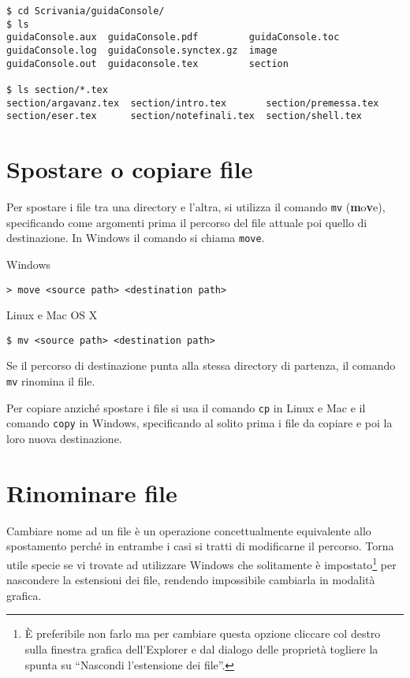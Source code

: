 \begin{Verbatim}[fontsize=\small]
$ cd Scrivania/guidaConsole/
$ ls
guidaConsole.aux  guidaConsole.pdf         guidaConsole.toc
guidaConsole.log  guidaConsole.synctex.gz  image
guidaConsole.out  guidaconsole.tex         section

$ ls section/*.tex
section/argavanz.tex  section/intro.tex       section/premessa.tex
section/eser.tex      section/notefinali.tex  section/shell.tex
\end{Verbatim}

\section{Spostare o copiare file}

Per spostare i file tra una directory e l'altra, si utilizza il comando
\texttt{mv} (\textbf{m}o\textbf{v}e), specificando come argomenti prima il
percorso del file attuale poi quello di destinazione. In Windows il comando si
chiama \texttt{move}.
\smallskip
\begin{tcolorbox}
Windows
\tcblower
\begin{verbatim}
> move <source path> <destination path>
\end{verbatim}
\end{tcolorbox}

\begin{tcolorbox}
Linux e Mac OS X
\tcblower
\begin{verbatim}
$ mv <source path> <destination path>
\end{verbatim}
\end{tcolorbox}

Se il percorso di destinazione punta alla stessa directory di partenza, il
comando \texttt{mv} rinomina il file.

Per copiare anziché spostare i file si usa il comando \texttt{cp} in Linux e
Mac e il comando \texttt{copy} in Windows, specificando al solito prima i file
da copiare e poi la loro nuova destinazione.

\section{Rinominare file}

Cambiare nome ad un file è un operazione concettualmente equivalente allo
spostamento perché in entrambe i casi si tratti di modificarne il percorso.
Torna utile specie se vi trovate ad utilizzare Windows che solitamente è
impostato\footnote{\`E preferibile non farlo ma per cambiare questa opzione
cliccare col destro sulla finestra grafica dell'Explorer e dal dialogo delle
proprietà togliere la spunta su ``Nascondi l'estensione dei file''.} per
nascondere la estensioni dei file, rendendo impossibile cambiarla in modalità
grafica.

